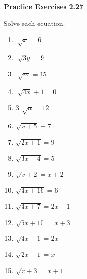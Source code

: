 \vspace{1ex}
\noindent\textbf{Practice Exercises 2.27}

\vspace{0.75ex}

Solve each equation.

\begin{multicols}{2}
\begin{enumerate}[noitemsep, label = \color{blue}\arabic*. ]
    \item \(\sqrt[]{x} = 6 \)
    \item \(\sqrt[]{3y} = 9 \)
    \item \(\sqrt[]{m} = 15 \)
    \item \(\sqrt[]{4x} + 1 = 0 \)
    \item \(3~\sqrt[]{a} = 12 \)
    \item \( \sqrt{x + 5} = 7 \)
    \item \( \sqrt{2x + 1} = 9 \)
    \item \( \sqrt{3x - 4} = 5 \)
    \item \( \sqrt{x + 2} = x + 2 \)
    \item \( \sqrt{4x + 16} = 6 \)
    \item \( \sqrt{4x + 7} = 2x - 1 \)
    \item \( \sqrt{6x + 10} = x + 3 \)
    \item \( \sqrt{4x - 1} = 2x \)
    \item \( \sqrt{2x - 1} = x \)
    \item \( \sqrt{x + 3} = x + 1 \)
\end{enumerate}
\end{multicols}
